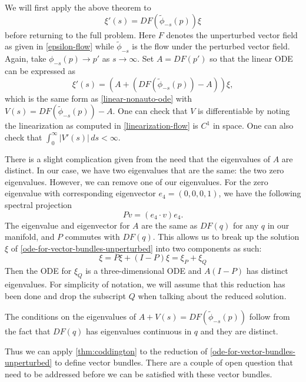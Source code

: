 We will first apply the above theorem to 
\begin{equation}\label{flow-for-tangent-vectors-unperturbed}
	\xi'(s) = DF(\tilde \phi_{-s}(p)) \xi
\end{equation}
before returning to the full problem. Here \(F\) denotes the unperturbed vector field as given in \cref{epsilon-flow} while \(\tilde\phi_{-s}\) is the flow under the perturbed vector field. Again, take \(\phi_{-s}(p) \to p'
\) as \(s\to \infty\). Set \(A = DF(p')\) so that the linear ODE can be expressed as
\begin{equation}\label{ode-for-vector-bundles-unperturbed}
	\xi'(s) = (A + (DF(\tilde \phi_{-s}(p)) - A)) \xi,
\end{equation}
which is the same form as \cref{linear-nonauto-ode} with \(V(s) = DF(\tilde \phi_{-s}(p)) - A\). One can check that \(V\) is differentiable by noting the linearization as computed in \cref{linearization-flow} is \(C^1\) in space. One can also check that \(\int_{0}^\infty |V'(s)|\, ds < \infty\).

There is a slight complication given from the need that the eigenvalues of \(A\) are distinct. In our case, we have two eigenvalues that are the same: the two zero eigenvalues. However, we can remove one of our eigenvalues. For the zero eigenvalue with corresponding eigenvector \(e_4 = (0, 0, 0, 1)\), we have the following spectral projection
\begin{equation}
	P v = (e_4 \cdot v) e_4.
\end{equation}
The eigenvalue and eigenvector for \(A\) are the same as \(DF(q)\) for any \(q\) in our manifold, and \(P\) commutes with \(DF(q)\). This allows us to break up the solution \(\xi\) of \cref{ode-for-vector-bundles-unperturbed} into two components as such:
\begin{equation}
	\xi = P\xi + (I-P)\xi = \xi_P + \xi_Q
\end{equation}
Then the ODE for \(\xi_Q\) is a three-dimensional ODE and \(A(I-P)\) has distinct eigenvalues. For simplicity of notation, we will assume that this reduction has been done and drop the subscript \(Q\) when talking about the reduced solution.

The conditions on the eigenvalues of \(A+V(s) = DF(\tilde\phi_{-s}(p))\) follow from the fact that \(DF(q)\) has eigenvalues continuous in \(q\) and they are distinct.

Thus we can apply \cref{thm:coddington} to the reduction of \cref{ode-for-vector-bundles-unperturbed} to define vector bundles. There are a couple of open question that need to be addressed before we can be satisfied with these vector bundles. 

